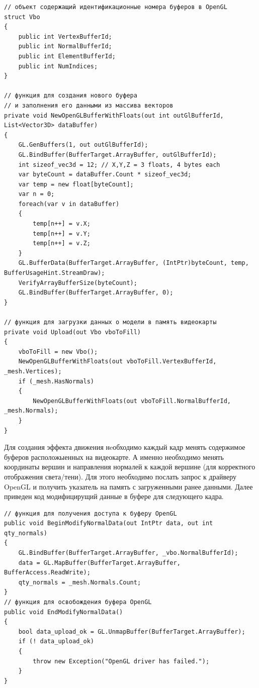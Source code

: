 \begin{verbatim}
// объект содержащий идентификационные номера буферов в OpenGL
struct Vbo
{
    public int VertexBufferId;
    public int NormalBufferId;
    public int ElementBufferId;
    public int NumIndices;
}

// функция для создания нового буфера 
// и заполнения его данными из массива векторов
private void NewOpenGLBufferWithFloats(out int outGlBufferId, List<Vector3D> dataBuffer) 
{
    GL.GenBuffers(1, out outGlBufferId);
    GL.BindBuffer(BufferTarget.ArrayBuffer, outGlBufferId);
    int sizeof_vec3d = 12; // X,Y,Z = 3 floats, 4 bytes each
    var byteCount = dataBuffer.Count * sizeof_vec3d;
    var temp = new float[byteCount];
    var n = 0;
    foreach(var v in dataBuffer)
    {
        temp[n++] = v.X;
        temp[n++] = v.Y;
        temp[n++] = v.Z;
    }
    GL.BufferData(BufferTarget.ArrayBuffer, (IntPtr)byteCount, temp, BufferUsageHint.StreamDraw);
    VerifyArrayBufferSize(byteCount);
    GL.BindBuffer(BufferTarget.ArrayBuffer, 0);
}

// функция для загрузки данных о модели в память видеокарты
private void Upload(out Vbo vboToFill)
{
    vboToFill = new Vbo();    
    NewOpenGLBufferWithFloats(out vboToFill.VertexBufferId, _mesh.Vertices);
    if (_mesh.HasNormals)
    {
        NewOpenGLBufferWithFloats(out vboToFill.NormalBufferId, _mesh.Normals);
    }
}

\end{verbatim}

Для создания эффекта движения нeобходимо каждый кадр менять содержимое буферов расположыенных на видеокарте.
А именно необходимо менять координаты вершин и направления нормалей к каждой вершине (для корректного отображения света/тени).
Для этого необходимо послать запрос к драйверу OpenGL и получить указатель на память с загруженными ранее данными.
Далее приведен код модифицирущий данные в буфере для следующего кадра.

\begin{verbatim}
// функция для получения доступа к буферу OpenGL
public void BeginModifyNormalData(out IntPtr data, out int qty_normals)
{
    GL.BindBuffer(BufferTarget.ArrayBuffer, _vbo.NormalBufferId);
    data = GL.MapBuffer(BufferTarget.ArrayBuffer, BufferAccess.ReadWrite);
    qty_normals = _mesh.Normals.Count;
}
// функция для освобождения буфера OpenGL
public void EndModifyNormalData()
{
    bool data_upload_ok = GL.UnmapBuffer(BufferTarget.ArrayBuffer);
    if (! data_upload_ok)
    {
        throw new Exception("OpenGL driver has failed.");
    }
}
\end{verbatim}


